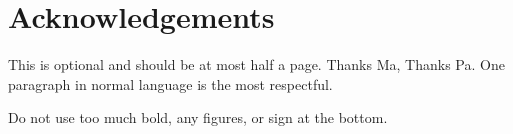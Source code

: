\chapter*{Acknowledgements}

This is optional and should be at most half a page.
Thanks Ma, Thanks Pa. One paragraph in normal language is the most respectful.  

Do not use too much bold, any figures, or sign at the bottom. 
